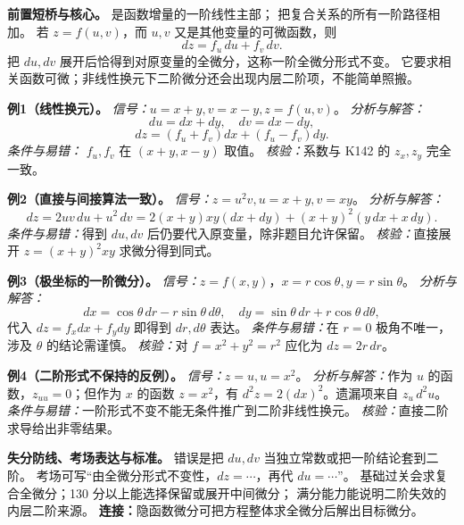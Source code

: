 
\begin{knowledgeBox}
\textbf{前置短桥与核心。}
是函数增量的一阶线性主部；
把复合关系的所有一阶路径相加。
若 \(z=f(u,v)\)，而 \(u,v\) 又是其他变量的可微函数，则
\[
dz=f_u\,du+f_v\,dv.
\]
把 \(du,dv\) 展开后恰得到对原变量的全微分，这称一阶全微分形式不变。
它要求相关函数可微；非线性换元下二阶微分还会出现内层二阶项，不能简单照搬。

\textbf{例1（线性换元）。}
\emph{信号：}\(u=x+y,v=x-y,z=f(u,v)\)。
\emph{分析与解答：}
\[
du=dx+dy,\quad dv=dx-dy,
\]
\[
dz=(f_u+f_v)dx+(f_u-f_v)dy.
\]
\emph{条件与易错：} \(f_u,f_v\) 在 \((x+y,x-y)\) 取值。
\emph{核验：}系数与 K142 的 \(z_x,z_y\) 完全一致。

\textbf{例2（直接与间接算法一致）。}
\emph{信号：}\(z=u^2v,u=x+y,v=xy\)。
\emph{分析与解答：}
\[
dz=2uv\,du+u^2\,dv
=2(x+y)xy(dx+dy)+(x+y)^2(y\,dx+x\,dy).
\]
\emph{条件与易错：}得到 \(du,dv\) 后仍要代入原变量，除非题目允许保留。
\emph{核验：}直接展开 \(z=(x+y)^2xy\) 求微分得到同式。

\textbf{例3（极坐标的一阶微分）。}
\emph{信号：}\(z=f(x,y)\)，\(x=r\cos\theta,y=r\sin\theta\)。
\emph{分析与解答：}
\[
dx=\cos\theta\,dr-r\sin\theta\,d\theta,\quad
dy=\sin\theta\,dr+r\cos\theta\,d\theta,
\]
代入 \(dz=f_xdx+f_ydy\) 即得到 \(dr,d\theta\) 表达。
\emph{条件与易错：}在 \(r=0\) 极角不唯一，涉及 \(\theta\) 的结论需谨慎。
\emph{核验：}对 \(f=x^2+y^2=r^2\) 应化为 \(dz=2r\,dr\)。

\textbf{例4（二阶形式不保持的反例）。}
\emph{信号：}\(z=u,u=x^2\)。
\emph{分析与解答：}作为 \(u\) 的函数，\(z_{uu}=0\)；但作为 \(x\) 的函数
\(z=x^2\)，有 \(d^2z=2(dx)^2\)。遗漏项来自 \(z_u\,d^2u\)。
\emph{条件与易错：}一阶形式不变不能无条件推广到二阶非线性换元。
\emph{核验：}直接二阶求导给出非零结果。

\textbf{失分防线、考场表达与标准。}
错误是把 \(du,dv\) 当独立常数或把一阶结论套到二阶。
考场可写“由全微分形式不变性，\(dz=\cdots\)，再代 \(du=\cdots\)”。
基础过关会求复合全微分；130 分以上能选择保留或展开中间微分；
满分能力能说明二阶失效的内层二阶来源。
\textbf{连接：}隐函数微分可把方程整体求全微分后解出目标微分。
\end{knowledgeBox}


